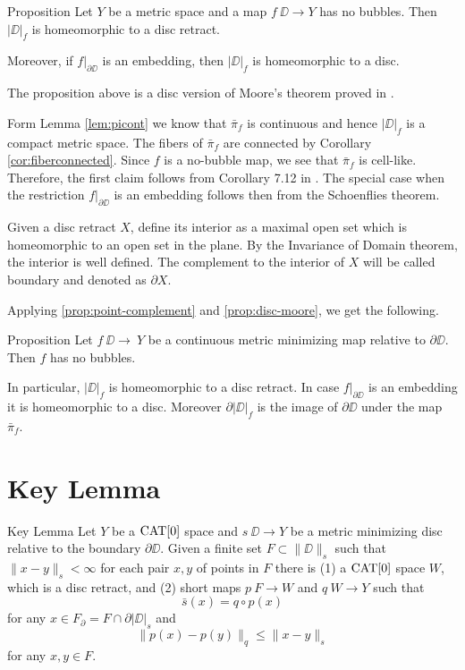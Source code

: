 \documentclass{article}
\begin{document}
\begin{thm}{Proposition}\label{prop:disc-moore}
Let $Y$ be a metric space and a map $f\:\DD\to Y$ has no bubbles.
Then $|\DD|_f$ is homeomorphic to a disc retract.

Moreover, if $f|_{\partial\DD}$ is an embedding, then $|\DD|_f$ is homeomorphic to a disc.
\end{thm}

The proposition above is a disc version of Moore's theorem \cite{moore} proved in \cite{LW3}.

Form Lemma \ref{lem:picont} we know that $\bar\pi_f$ is continuous and hence $|\DD|_f$
is a compact metric space. 
The fibers of $\bar\pi_f$ are connected by Corollary \ref{cor:fiberconnected}.
Since $f$ is a no-bubble map, we see that $\bar\pi_f$ is cell-like. 
Therefore, the first claim follows from 
Corollary 7.12 in \cite{LW3}.
The special case when the restriction $f|_{\partial\DD}$ is an embedding follows then from the Schoenflies theorem.
\qeds

Given a disc retract $X$,
define its interior as a maximal open set which is homeomorphic to an open set in the plane.
By the Invariance of Domain theorem, the interior is well defined.
The complement to the interior of $X$ will be called boundary and denoted as $\partial X$.

Applying \ref{prop:point-complement} and \ref{prop:disc-moore}, we get the following.

\begin{thm}{Proposition}\label{prop:|D|}
Let $f\:\DD\to\ Y$ be a continuous metric minimizing map relative to $\partial \DD$.
Then $f$ has no bubbles.

In particular,  $|\DD|_f$ is homeomorphic to a disc retract. 
In case $f|_{\partial\DD}$ is an
embedding it is homeomorphic to a disc.
Moreover $\partial|\DD|_f$ is the image of $\partial \DD$
under the map $\bar\pi_f$.
\end{thm}











\section{Key Lemma}\label{Key Lemma}


\begin{thm}{Key Lemma}\label{lem:key}
Let $Y$ be a $\mathop{\rm CAT}\nolimits[0]$ space and $s\:\DD\to Y$ 
be a metric minimizing disc relative to the boundary $\partial \DD$.
Given a finite set $F\subset \|\DD\|_s$ such that $\|x-y\|_s<\infty$ for each pair $x,y$ of points in $F$
there is 
(1) a $\mathop{\rm CAT}\nolimits[0]$ space $W$, which is a disc retract,
and (2) short maps $p\:F\to W$ and $q\:W\to Y$ such that
\[\bar s(x)=q\circ p(x)\] 
for any $x\in F_{\partial}=F\cap \partial |\DD|_s$
and 
\[\|p(x)-p(y)\|_q\le \|x-y\|_s\] 
for any $x,y\in F$.
\end{thm}
\end{document}
